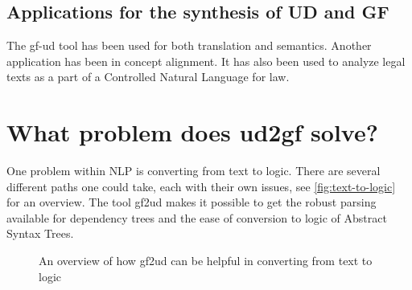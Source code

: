 


\subsection{Applications for the synthesis of UD and GF}

The gf-ud tool has been used for both translation and semantics\cite{ranta-al-2020}. %
Another application has been in concept alignment\cite{masciolini-ranta-2021}.
It has also been used to analyze legal texts as a part of a Controlled Natural Language for law\cite{listenmaa-etal-2021-towards}.

\section{What problem does ud2gf solve?}
%
%

One problem within \ac{NLP} is converting from text to logic. There are several different paths one could take, each with their own issues, see \autoref{fig:text-to-logic} for an overview. The tool gf2ud makes it possible to get the robust parsing available for dependency trees and the ease of conversion to logic of Abstract Syntax Trees.

\begin{figure}[H]
    \centering
    \caption{An overview of how gf2ud can be helpful in converting from text to logic}
    \label{fig:text-to-logic}
\end{figure}


